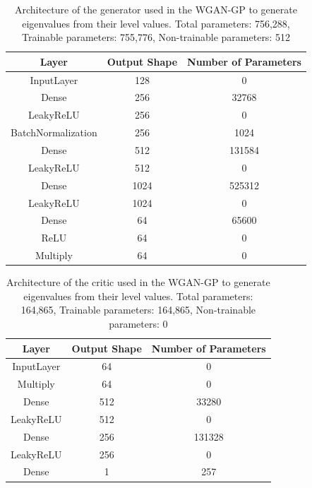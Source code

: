 \documentclass[11pt,a4paper,twoside]{report}
\begin{document}
\begin{table}[]
  \centering
  \begin{tabular}{c c c}
      \hline
      \textbf{Layer} & \textbf{Output Shape} & \textbf{Number of Parameters} \\ \hline
      InputLayer            & 128           & 0                 \\
      Dense                 & 256           & 32768             \\
      LeakyReLU             & 256           & 0                 \\
      BatchNormalization    & 256           & 1024              \\
      Dense                 & 512           & 131584            \\
      LeakyReLU             & 512           & 0                 \\
      Dense                 & 1024          & 525312            \\
      LeakyReLU             & 1024          & 0                 \\
      Dense                 & 64            & 65600             \\
      ReLU                  & 64            & 0                 \\
      Multiply              & 64            & 0                 \\
  \end{tabular}
  \caption{Architecture of the generator used in the WGAN-GP to generate eigenvalues from their level values. Total parameters: 756,288, Trainable parameters: 755,776, Non-trainable parameters: 512}
  \label{tab:evals_dB_generator_WGANGP_architecture}
\end{table}

\begin{table}[]
  \centering
  \begin{tabular}{c c c}
      \hline
      \textbf{Layer} & \textbf{Output Shape} & \textbf{Number of Parameters} \\ \hline
      InputLayer            & 64            & 0                 \\
      Multiply              & 64            & 0                 \\
      Dense                 & 512           & 33280             \\
      LeakyReLU             & 512           & 0                 \\
      Dense                 & 256           & 131328            \\
      LeakyReLU             & 256           & 0                 \\
      Dense                 & 1             & 257               \\
  \end{tabular}
  \caption{Architecture of the critic used in the WGAN-GP to generate eigenvalues from their level values. Total parameters: 164,865, Trainable parameters: 164,865, Non-trainable parameters: 0}
  \label{tab:evals_dB_critic_WGANGP_architecture}
\end{table}
\end{document}
